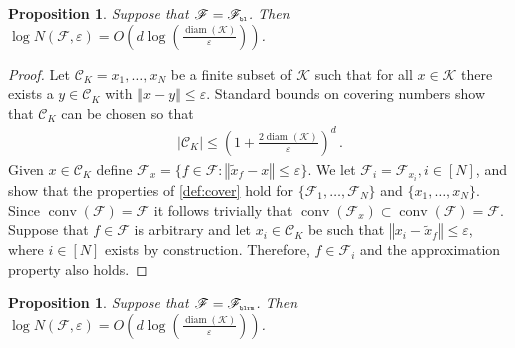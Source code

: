 \documentclass[letter, 12pt]{report}
\newcommand{\pr}{\text{\tiny\texttt{r}}}
\newcommand{\pb}{\text{\tiny\texttt{b}}}
\newcommand{\pl}{\text{\tiny\texttt{l}}}
\renewcommand{\pm}{\text{\tiny\texttt{m}}}
\newcommand{\norm}[1]{\left \Vert  #1 \right \Vert}
\newcommand{\cK}{\mathcal K}
\newcommand{\cC}{\mathcal C}
\newcommand{\sF}{\mathscr F}
\newcommand{\conv}{\operatorname{conv}}
\newcommand{\diam}{\operatorname{diam}}
\newcommand{\1}{\mathbf{1}}
\renewcommand{\epsilon}{\varepsilon}
\theoremstyle{plain}
\newtheorem{proposition}[theorem]{Proposition}
\theoremstyle{definition}
\theoremstyle{remark}
\begin{document}
\begin{proposition}\label{prop:N}
    Suppose that $\sF = \sF_{\pb\pl}$. Then $\log N(\sF, \epsilon) = O\left(d \log\left(\frac{\diam(\cK)}{\epsilon}\right)\right)$.
\end{proposition}
\begin{proof}
    Let $\cC_K={x_1, \ldots, x_N}$ be a finite subset of $\cK$ such that for all $x \in \cK$ there exists a $y \in \cC_K$ with $\norm{x - y} \leq \epsilon$.
    Standard bounds on covering numbers \citep[\S4]{ASG15} show that $\cC_K$ can be chosen so that
    \begin{align*}
        |\cC_K| \leq \left(1 + \frac{2\diam(\cK)}{\epsilon}\right)^d \,.
    \end{align*}
    Given $x \in \cC_K$ define $\sF_x = \{f \in \sF : \norm{\tilde x_f - x} \leq \epsilon\}$.
    We let $\sF_i = \sF_{x_i}, i \in [N]$,
    and show that the properties of \cref{def:cover} hold for $\{\sF_1,\ldots,\sF_N\}$ and $\{x_1, \ldots, x_N\}$.
    Since $\conv(\sF) = \sF$ it follows trivially that $\conv(\sF_x) \subset \conv(\sF) = \sF$.
    Suppose that $f \in \sF$ is arbitrary and let $x_i \in \cC_K$ be such that $\norm{x_i - \tilde x_f} \leq \epsilon$, where $i\in[N]$ exists by construction.
    Therefore, $f \in \sF_i$ and the approximation property also holds.
\end{proof}

\begin{proposition}\label{prop:N-ridge}
    Suppose that $\sF = \sF_{\pb\pl\pr\pm}$. Then $\log N(\sF, \epsilon) = O\left(d \log\left(\frac{\diam(\cK)}{\epsilon}\right)\right)$.
\end{proposition}
\end{document}

